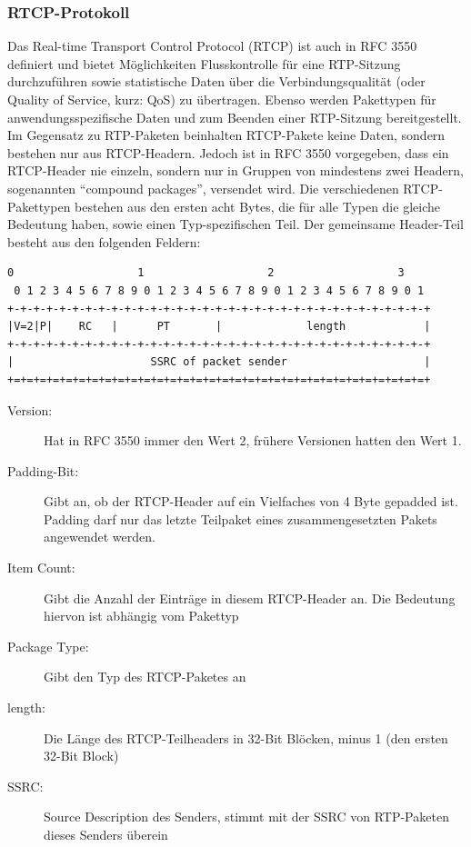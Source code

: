 \subsubsection{RTCP-Protokoll}
\label{rtcp}
Das Real-time Transport Control Protocol (RTCP) ist auch in RFC 3550 definiert und bietet Möglichkeiten Flusskontrolle für eine RTP-Sitzung durchzuführen sowie statistische Daten über die Verbindungsqualität (oder Quality of Service, kurz: QoS) zu übertragen. Ebenso werden Pakettypen für anwendungsspezifische Daten und zum Beenden einer RTP-Sitzung bereitgestellt. Im Gegensatz zu RTP-Paketen beinhalten RTCP-Pakete keine Daten, sondern bestehen nur aus RTCP-Headern. Jedoch ist in RFC 3550 vorgegeben, dass ein RTCP-Header nie einzeln, sondern nur in Gruppen von mindestens zwei Headern, sogenannten \enquote{compound packages}, versendet wird. Die verschiedenen RTCP-Pakettypen bestehen aus den ersten acht Bytes, die für alle Typen die gleiche Bedeutung haben, sowie einen Typ-spezifischen Teil. Der gemeinsame Header-Teil besteht aus den folgenden Feldern:
\begin{lstlisting}[keepspaces=true,numbers=none,label=lst=rtcpHeader,caption=RTCP Header \cite{RFC3550}]
 0                   1                   2                   3
 0 1 2 3 4 5 6 7 8 9 0 1 2 3 4 5 6 7 8 9 0 1 2 3 4 5 6 7 8 9 0 1
+-+-+-+-+-+-+-+-+-+-+-+-+-+-+-+-+-+-+-+-+-+-+-+-+-+-+-+-+-+-+-+-+
|V=2|P|    RC   |      PT       |             length            |
+-+-+-+-+-+-+-+-+-+-+-+-+-+-+-+-+-+-+-+-+-+-+-+-+-+-+-+-+-+-+-+-+
|                     SSRC of packet sender                     |
+=+=+=+=+=+=+=+=+=+=+=+=+=+=+=+=+=+=+=+=+=+=+=+=+=+=+=+=+=+=+=+=+
\end{lstlisting}
\begin{description}
\item[Version:] Hat in RFC 3550 immer den Wert 2, frühere Versionen hatten den Wert 1.
\item[Padding-Bit:] Gibt an, ob der RTCP-Header auf ein Vielfaches von 4 Byte gepadded ist. Padding darf nur das letzte Teilpaket eines zusammengesetzten Pakets angewendet werden.
\item[Item Count:] Gibt die Anzahl der Einträge in diesem RTCP-Header an. Die Bedeutung hiervon ist abhängig vom Pakettyp
\item[Package Type:] Gibt den Typ des RTCP-Paketes an
\item[length:] Die Länge des RTCP-Teilheaders in 32-Bit Blöcken, minus 1 (den ersten 32-Bit Block)
\item[SSRC:] Source Description des Senders, stimmt mit der SSRC von RTP-Paketen dieses Senders überein
\end{description}
